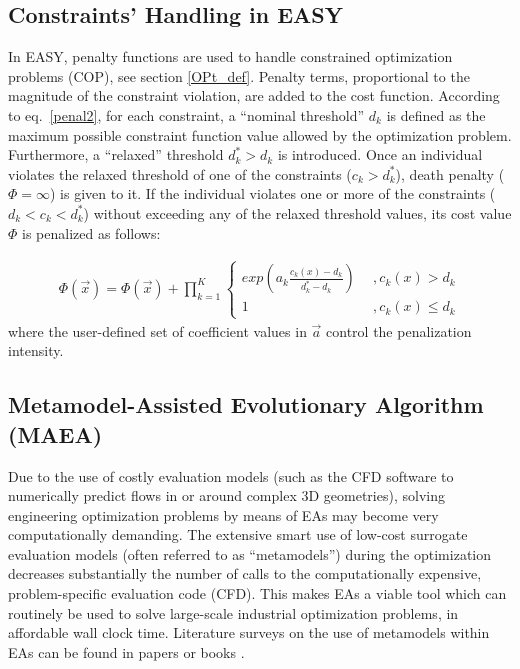 \subsection{Constraints' Handling in EASY}
\label{COP}
In EASY, penalty functions are used to handle constrained optimization problems (COP), see section \ref{OPt_def}. Penalty terms, proportional to the magnitude of the constraint violation, are added to the cost function. According to eq.\ \ref{penal2}, for each constraint, a ``nominal threshold'' $d_k$ is defined as the maximum possible constraint function value allowed by the optimization problem. Furthermore, a ``relaxed'' threshold $d_k^* > d_k$ is introduced. Once an individual violates the relaxed threshold of one of the constraints ($c_k \! > \! d_k^*$), death penalty ($\Phi \! = \! \infty$) is given to it. If the individual violates one or more of the constraints ($d_k \! < \! c_k \! < \! d_k^*$) without exceeding any of the relaxed threshold values, its cost value $\Phi$ is penalized as follows:

\begin{eqnarray}
	\Phi(\vec{x})=\Phi(\vec{x})+ \prod _{k=1}^K{\left\{ 				\begin{array}{ll}
    exp(a_k\frac{c_k(x)-d_k}{d_k^* -d_k}) & ~~,c_k(x)>d_k\\
    1 & ~~,c_k(x)\leq d_k\end{array} \right. }
    \label{penal2}
\end{eqnarray}  
where the user-defined set of coefficient values in $\vec{a}$ control the penalization intensity.

 

\subsection{Metamodel-Assisted Evolutionary Algorithm (MAEA)}
\label{MAEApar}
Due to the use of costly evaluation models (such as the CFD software to numerically predict flows in or around complex 3D geometries), solving engineering optimization problems by means of EAs may become very computationally demanding. The extensive smart use of low-cost surrogate evaluation models (often referred to as ``metamodels'') during the optimization decreases substantially the number of calls to the computationally expensive, problem-specific evaluation code (CFD). This makes EAs a viable tool which can routinely be used to solve large-scale industrial optimization problems, in affordable wall clock time. Literature surveys on the use of metamodels within EAs can be found in papers \cite{LTT_2_020,Jin2002,LTT_2_027,EBNK} or books \cite{KEANEbook}.


